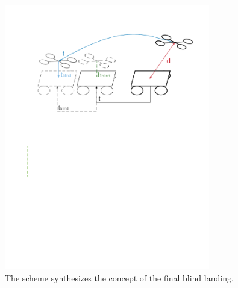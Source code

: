\begin{figure}[!htbp]
    \centering
    \includegraphics[width=0.8\textwidth]{img/blind_landing.pdf}
    \caption{The scheme synthesizes the concept of the final blind landing. }
    \label{fig:align_platform}
\end{figure}

